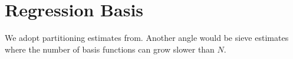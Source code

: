 \section*{Regression Basis}
We adopt partitioning estimates from\cite{Gyorfi2002}. Another angle would be sieve estimates\cite{Newey1997a} where the number of basis functions can grow slower than $N$.
%
%
%
